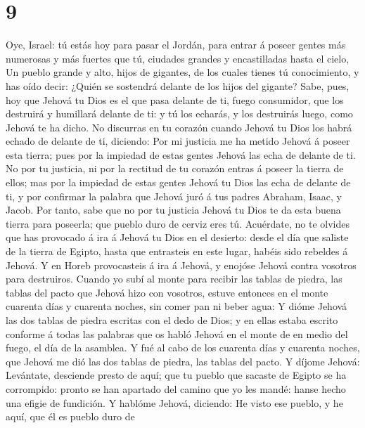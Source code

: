 \hypertarget{section-8}{%
\section{9}\label{section-8}}

 Oye, Israel: tú estás hoy para pasar el Jordán, para
entrar á poseer gentes más numerosas y más fuertes que tú, ciudades
grandes y encastilladas hasta el cielo,  Un pueblo grande
y alto, hijos de gigantes, de los cuales tienes tú conocimiento, y has
oído decir: ¿Quién se sostendrá delante de los hijos del gigante?
 Sabe, pues, hoy que Jehová tu Dios es el que pasa delante
de ti, fuego consumidor, que los destruirá y humillará delante de ti: y
tú los echarás, y los destruirás luego, como Jehová te ha dicho.
 No discurras en tu corazón cuando Jehová tu Dios los
habrá echado de delante de ti, diciendo: Por mi justicia me ha metido
Jehová á poseer esta tierra; pues por la impiedad de estas gentes Jehová
las echa de delante de ti.  No por tu justicia, ni por la
rectitud de tu corazón entras á poseer la tierra de ellos; mas por la
impiedad de estas gentes Jehová tu Dios las echa de delante de ti, y por
confirmar la palabra que Jehová juró á tus padres Abraham, Isaac, y
Jacob.  Por tanto, sabe que no por tu justicia Jehová tu
Dios te da esta buena tierra para poseerla; que pueblo duro de cerviz
eres tú.  Acuérdate, no te olvides que has provocado á ira
á Jehová tu Dios en el desierto: desde el día que saliste de la tierra
de Egipto, hasta que entrasteis en este lugar, habéis sido rebeldes á
Jehová.  Y en Horeb provocasteis á ira á Jehová, y enojóse
Jehová contra vosotros para destruiros.  Cuando yo subí al
monte para recibir las tablas de piedra, las tablas del pacto que Jehová
hizo con vosotros, estuve entonces en el monte cuarenta días y cuarenta
noches, sin comer pan ni beber agua:  Y dióme Jehová las
dos tablas de piedra escritas con el dedo de Dios; y en ellas estaba
escrito conforme á todas las palabras que os habló Jehová en el monte de
en medio del fuego, el día de la asamblea.  Y fué al cabo
de los cuarenta días y cuarenta noches, que Jehová me dió las dos tablas
de piedra, las tablas del pacto.  Y díjome Jehová:
Levántate, desciende presto de aquí; que tu pueblo que sacaste de Egipto
se ha corrompido: pronto se han apartado del camino que yo les mandé:
hanse hecho una efigie de fundición.  Y hablóme Jehová,
diciendo: He visto ese pueblo, y he aquí, que él es pueblo duro de
